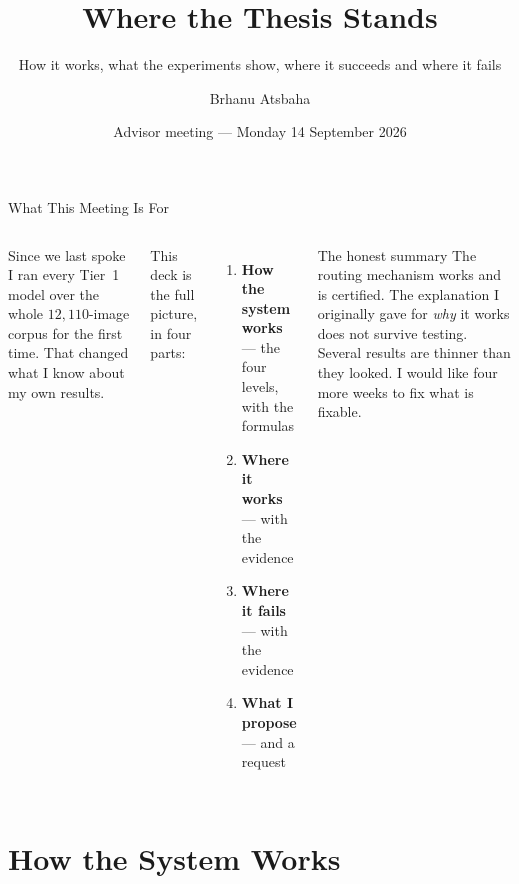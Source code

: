 \documentclass[aspectratio=169,11pt]{beamer}
\title[Advisor Meeting]{Where the Thesis Stands}
\subtitle{\normalsize How it works, what the experiments show, where it succeeds and where it fails}
\author{Brhanu Atsbaha}
\institute{Universität Hildesheim\\[0.15cm]\small \textbf{Advisors:} Prof. Dr. Thomas Mandl \& Shereen Elsayed}
\date{Advisor meeting --- Monday 14 September 2026}
\begin{document}
\maketitle

\begin{frame}{What This Meeting Is For}
\begin{columns}[T]
\small
Since we last spoke I ran every Tier~1 model over the whole $12{,}110$-image corpus for the first time. That changed what I know about my own results.
\vspace{2mm}

This deck is the full picture, in four parts:
\begin{enumerate}\small
  \item \textbf{How the system works} --- the four levels, with the formulas
  \item \textbf{Where it works} --- with the evidence
  \item \textbf{Where it fails} --- with the evidence
  \item \textbf{What I propose} --- and a request
\end{enumerate}

\begin{block}{\small The honest summary}
\footnotesize The routing mechanism works and is certified. The explanation I originally gave for \emph{why} it works does not survive testing. Several results are thinner than they looked. I would like four more weeks to fix what is fixable.
\end{block}
\end{columns}
\end{frame}

\section{How the System Works}
\end{document}
